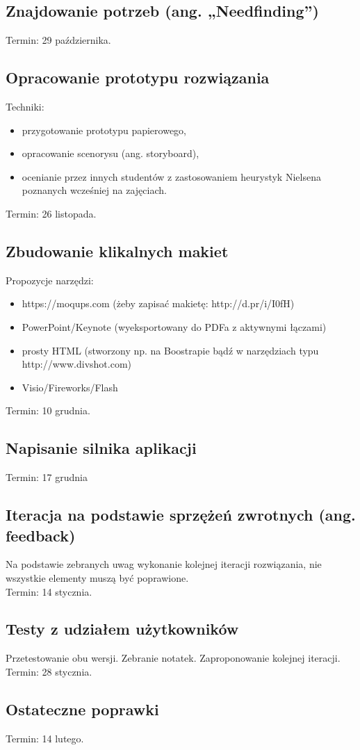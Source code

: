 \subsection{Znajdowanie potrzeb (ang. „Needfinding”)}

Termin: 29 października.

\subsection{Opracowanie prototypu rozwiązania}

Techniki:\begin{itemize}
\item przygotowanie prototypu papierowego,
\item opracowanie scenorysu (ang. storyboard),
\item ocenianie przez innych studentów z zastosowaniem heurystyk Nielsena poznanych wcześniej 
na zajęciach.
\end{itemize}
Termin: 26 listopada.

\subsection{Zbudowanie klikalnych makiet}

Propozycje narzędzi:\begin{itemize}
\item https://moqups.com (żeby zapisać makietę: http://d.pr/i/I0fH)
\item PowerPoint/Keynote (wyeksportowany do PDFa z aktywnymi łączami)
\item prosty HTML (stworzony np. na Boostrapie bądź w narzędziach typu http://www.divshot.com)
\item Visio/Fireworks/Flash
\end{itemize}
Termin: 10 grudnia.

\subsection{Napisanie silnika aplikacji}

Termin: 17 grudnia

\subsection{Iteracja na podstawie sprzężeń zwrotnych (ang. feedback)}

Na podstawie zebranych uwag wykonanie kolejnej iteracji rozwiązania, nie wszystkie elementy muszą być poprawione.\\

Termin: 14 stycznia.

\subsection{Testy z udziałem użytkowników}

Przetestowanie obu wersji. Zebranie notatek. Zaproponowanie kolejnej iteracji.\\

Termin: 28 stycznia.

\subsection{Ostateczne poprawki}

Termin: 14 lutego.
